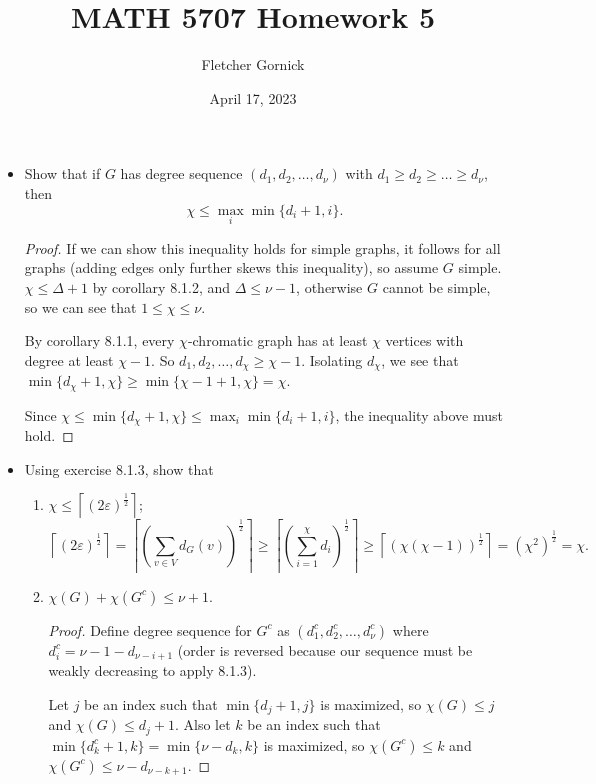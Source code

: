 \documentclass[11pt]{article}
\title{\vspace{-1.5cm}MATH 5707 Homework 5}
\author{Fletcher Gornick}
\date{April 17, 2023}
\newcommand\itm[1]{\item[\textbf{#1}]}
\newcommand{\n}{\vspace{0.2cm}}
\def\lc{\left\lceil}
\def\rc{\right\rceil}
\begin{document}
\maketitle
\begin{itemize}
  \itm{8.1.3} Show that if \(G\) has degree sequence \((d_1,d_2, \hdots, d_\nu)\) with \(d_1 \geq d_2 \geq \hdots \geq d_\nu\), then 
  \[\chi \leq \max_i \min \{d_i+1, i\}.\]
  \begin{proof}
    If we can show this inequality holds for simple graphs, it follows for all graphs (adding edges only further skews this inequality), so assume \(G\) simple.  \(\chi \leq \Delta + 1\) by corollary 8.1.2, and \(\Delta \leq \nu-1\), otherwise \(G\) cannot be simple,  so we can see that \(1 \leq \chi \leq \nu\). \n

    By corollary 8.1.1, every \(\chi\)-chromatic graph has at least \(\chi\) vertices with degree at least \(\chi-1\).  So \(d_1, d_2, \hdots, d_\chi \geq \chi-1\).  Isolating \(d_\chi\), we see that \(\min \{d_\chi + 1, \chi\} \geq \min \{\chi-1+1, \chi\} = \chi\). \n

    Since \(\chi \leq \min \{d_\chi + 1, \chi\} \leq \max_i \min \{d_i+1, i\}\), the inequality above must hold.
  \end{proof} \n
  


  \itm{8.1.4} Using exercise 8.1.3, show that \begin{enumerate}[label=(\alph*)]
    \item \(\chi \leq \lc(2\varepsilon)^\frac12\rc\);
      \[\lc(2\varepsilon)^{\frac12}\rc = \lc\left( \sum_{v \in V} d_G(v) \right)^\frac12\rc
                                 \geq \lc\left( \sum_{i=1}^\chi d_i \right)^\frac12\rc
                                 \geq \lc(\chi (\chi-1))^\frac12\rc
                                 = (\chi^2)^\frac12
                                 = \chi.\]
      
    \item \(\chi(G) + \chi(G^c) \leq \nu + 1\).
      \begin{proof}
        Define degree sequence for \(G^c\) as \((d_1^c, d_2^c, \hdots, d_\nu^c)\) where \(d_i^c = \nu-1-d_{\nu-i+1}\) (order is reversed because our sequence must be weakly decreasing to apply 8.1.3). \n

        Let \(j\) be an index such that \(\min \{d_j+1, j\}\) is maximized, so \(\chi(G) \leq j\) and \(\chi(G) \leq d_j+1\).  Also let \(k\) be an index such that \(\min \{d_k^c+1, k\}=\min \{\nu-d_k, k\}\) is maximized, so \(\chi(G^c) \leq k\) and \(\chi(G^c) \leq \nu-d_{\nu-k+1}\). \n


\end{proof}
\end{enumerate}
\end{itemize}
\end{document}
